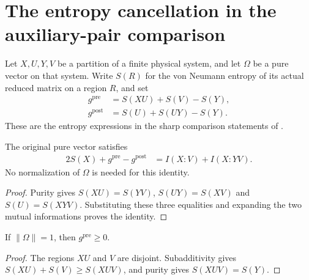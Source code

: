 \section{The entropy cancellation in the auxiliary-pair comparison}
\label{sec:auxiliary_pair_entropy}

Let $X,U,Y,V$ be a partition of a finite physical system, and let $\Omega$
be a pure vector on that system. Write $S(R)$ for the von Neumann entropy
of its actual reduced matrix on a region $R$, and set
\begin{align}
 g^{\mathrm{pre}}&=S(XU)+S(V)-S(Y),\\
 g^{\mathrm{post}}&=S(U)+S(UY)-S(Y).
 \label{eq:auxiliary_pair_entropy_expressions}
\end{align}
These are the entropy expressions in the sharp comparison statements of
\cite[Section~7]{OpenAI2026AreaLaw}.

\begin{theorem}
\label{thm:auxiliary_pair_entropy_identity}
\leanok
The original pure vector satisfies
\begin{align}
 2S(X)+g^{\mathrm{pre}}-g^{\mathrm{post}}
 &=I(X:V)+I(X:YV).
 \label{eq:auxiliary_pair_entropy_identity}
\end{align}
No normalization of $\Omega$ is needed for this identity.
\end{theorem}
\begin{proof}
\leanok
Purity gives $S(XU)=S(YV)$, $S(UY)=S(XV)$ and $S(U)=S(XYV)$.
Substituting these three equalities and expanding the two mutual
informations proves the identity.
\end{proof}

\begin{theorem}
\label{thm:auxiliary_pair_pre_nonneg}
\leanok
If $\|\Omega\|=1$, then $g^{\mathrm{pre}}\ge0$.
\end{theorem}
\begin{proof}
\leanok
The regions $XU$ and $V$ are disjoint. Subadditivity gives
$S(XU)+S(V)\ge S(XUV)$, and purity gives $S(XUV)=S(Y)$.
\end{proof}
